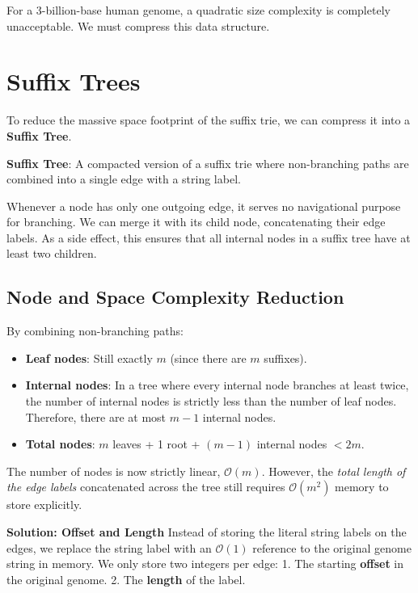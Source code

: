 For a 3-billion-base human genome, a quadratic size complexity is completely unacceptable. We must compress this data structure.

\section{Suffix Trees}

To reduce the massive space footprint of the suffix trie, we can compress it into a \textbf{Suffix Tree}.

\begin{important}
    \textbf{Suffix Tree}: A compacted version of a suffix trie where non-branching paths are combined into a single edge with a string label.
\end{important}

Whenever a node has only one outgoing edge, it serves no navigational purpose for branching. We can merge it with its child node, concatenating their edge labels. As a side effect, this ensures that all internal nodes in a suffix tree have at least two children.


\subsection{Node and Space Complexity Reduction}

By combining non-branching paths:
\begin{itemize}
    \item \textbf{Leaf nodes}: Still exactly $m$ (since there are $m$ suffixes).
    \item \textbf{Internal nodes}: In a tree where every internal node branches at least twice, the number of internal nodes is strictly less than the number of leaf nodes. Therefore, there are at most $m-1$ internal nodes.
    \item \textbf{Total nodes}: $m$ leaves + 1 root + $(m-1)$ internal nodes $< 2m$.
\end{itemize}

The number of nodes is now strictly linear, $\mathcal{O}(m)$. However, the \textit{total length of the edge labels} concatenated across the tree still requires $\mathcal{O}(m^2)$ memory to store explicitly.

\textbf{Solution: Offset and Length}
Instead of storing the literal string labels on the edges, we replace the string label with an $\mathcal{O}(1)$ reference to the original genome string in memory. We only store two integers per edge:
1. The starting \textbf{offset} in the original genome.
2. The \textbf{length} of the label.

